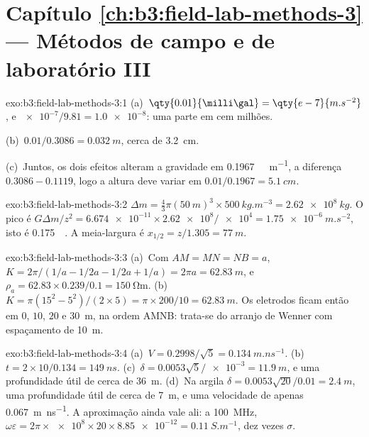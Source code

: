 \section*{Capítulo \ref{ch:b3:field-lab-methods-3} --- Métodos de campo e de laboratório III}

\begin{solution}{exo:b3:field-lab-methods-3:1}
(a)~$\qty{0.01}{\milli\gal} = \qty{e-7}{m.s^{-2}}$, e
$\num{e-7}/\num{9.81} = \num{1.0e-8}$: uma parte em cem milhões.

(b)~$0.01/0.3086 = \qty{0.032}{m}$, cerca de \qty{3.2}{cm}.

(c)~Juntos, os dois efeitos alteram a gravidade em
\qty{0.1967}{\milli\gal.m^{-1}}, a diferença $0.3086 - 0.1119$, logo
a altura deve variar em $0.01/0.1967 = \qty{5.1}{cm}$.
\end{solution}

\begin{solution}{exo:b3:field-lab-methods-3:2}
$\Delta m = \tfrac43\pi(\qty{50}{m})^3\times\qty{500}{kg.m^{-3}} =
\qty{2.62e8}{kg}$. O pico é $G\Delta m/z^2 =
\num{6.674e-11}\times\num{2.62e8}/\num{e4} = \qty{1.75e-6}{m.s^{-2}}$,
isto é \qty{0.175}{\milli\gal}. A meia-largura é $x_{1/2} = z/1.305 =
\qty{77}{m}$.
\end{solution}

\begin{solution}{exo:b3:field-lab-methods-3:3}
(a)~Com $AM = MN = NB = a$, $K = 2\pi/(1/a - 1/2a - 1/2a + 1/a) =
2\pi a = \qty{62.83}{m}$, e $\rho_a = 62.83\times0.239/0.1 =
\qty{150}{\ohm\metre}$. (b)~$K = \pi(15^2 - 5^2)/(2\times5) = \pi\times
200/10 = \qty{62.83}{m}$. Os eletrodos ficam então em $0$, $10$, $20$
e \qty{30}{m}, na ordem AMNB: trata-se do arranjo de Wenner com espaçamento de
\qty{10}{m}.
\end{solution}

\begin{solution}{exo:b3:field-lab-methods-3:4}
(a)~$V = 0.2998/\sqrt5 = \qty{0.134}{m.ns^{-1}}$. (b)~$t =
2\times10/0.134 = \qty{149}{ns}$. (c)~$\delta = 0.0053\sqrt5/\num{e-3} =
\qty{11.9}{m}$, e uma profundidade útil de cerca de \qty{36}{m}. (d)~Na argila
$\delta = 0.0053\sqrt{20}/0.01 = \qty{2.4}{m}$, uma profundidade útil de cerca de
\qty{7}{m}, e uma velocidade de apenas \qty{0.067}{m.ns^{-1}}. A
aproximação ainda vale ali: a \qty{100}{MHz},
$\omega\varepsilon = 2\pi\times\num{e8}\times20\times\num{8.85e-12} =
\qty{0.11}{S.m^{-1}}$, dez vezes $\sigma$.
\end{solution}

